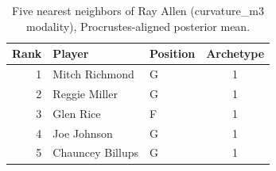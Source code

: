 \begin{table}[htbp]
  \centering\small
  \begin{tabular}{rllc}
    \toprule
    Rank & Player & Position & Archetype \\
    \midrule
    1 & Mitch Richmond & G & 1 \\
    2 & Reggie Miller & G & 1 \\
    3 & Glen Rice & F & 1 \\
    4 & Joe Johnson & G & 1 \\
    5 & Chauncey Billups & G & 1 \\
    \bottomrule
  \end{tabular}
  \caption{Five nearest neighbors of Ray Allen (curvature_m3 modality), Procrustes-aligned posterior mean.}
  \label{tab:Ray_Allen_neighbors_curvature_m3}
\end{table}

